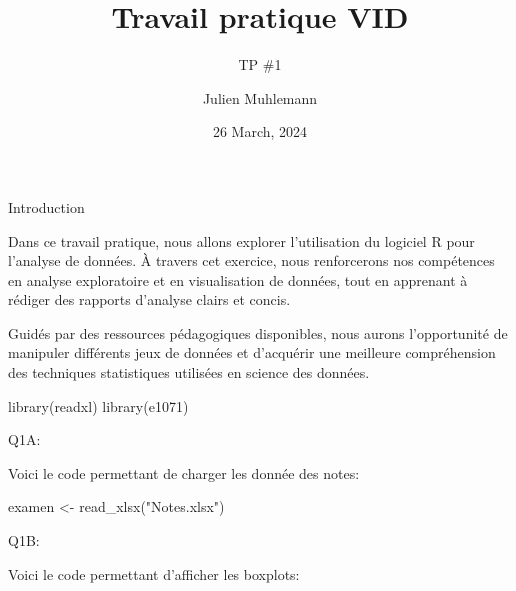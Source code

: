 \documentclass[
  letterpaper,
  DIV=11,
  numbers=noendperiod]{scrartcl}
\title{Travail pratique VID}
\subtitle{TP \#1}
\author{Julien Muhlemann}
\date{26 March, 2024}
\newenvironment{Shaded}{}{}
\newcommand{\FunctionTok}[1]{\textcolor[rgb]{0.44,0.26,0.76}{#1}}
\newcommand{\NormalTok}[1]{\textcolor[rgb]{0.14,0.16,0.18}{#1}}
\newcommand{\OtherTok}[1]{\textcolor[rgb]{0.44,0.26,0.76}{#1}}
\newcommand{\StringTok}[1]{\textcolor[rgb]{0.01,0.18,0.38}{#1}}
\renewcommand*\contentsname{Table of contents}
\newcommand\contentsname{Table of contents}
\begin{document}
\maketitle
\ifdefined\Shaded\renewenvironment{Shaded}{\begin{tcolorbox}[enhanced, borderline west={3pt}{0pt}{shadecolor}, interior hidden, breakable, boxrule=0pt, frame hidden, sharp corners]}{\end{tcolorbox}}\fi

\renewcommand*\contentsname{Table of contents}
{
\hypersetup{linkcolor=}
\setcounter{tocdepth}{3}
\tableofcontents
}
Introduction

Dans ce travail pratique, nous allons explorer l'utilisation du logiciel
R pour l'analyse de données. À travers cet exercice, nous renforcerons
nos compétences en analyse exploratoire et en visualisation de données,
tout en apprenant à rédiger des rapports d'analyse clairs et concis.

Guidés par des ressources pédagogiques disponibles, nous aurons
l'opportunité de manipuler différents jeux de données et d'acquérir une
meilleure compréhension des techniques statistiques utilisées en science
des données.

\begin{Shaded}
\begin{Highlighting}[]
\FunctionTok{library}\NormalTok{(readxl)}
\FunctionTok{library}\NormalTok{(e1071)}
\end{Highlighting}
\end{Shaded}

Q1A:

Voici le code permettant de charger les donnée des notes:\\

\begin{Shaded}
\begin{Highlighting}[]
\NormalTok{examen }\OtherTok{\textless{}{-}} \FunctionTok{read\_xlsx}\NormalTok{(}\StringTok{"Notes.xlsx"}\NormalTok{)}
\end{Highlighting}
\end{Shaded}

Q1B:

Voici le code permettant d'afficher les boxplots:
\end{document}

